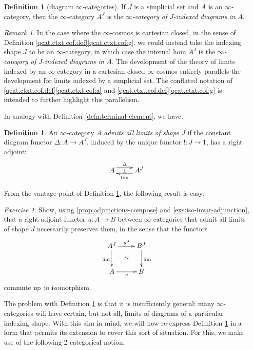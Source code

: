 \documentclass[12pt,reqno]{amsart}
\theoremstyle{plain}
\theoremstyle{definition}
\newtheorem{defn}[thm]{Definition}
\theoremstyle{remark}
\newtheorem{rmk}[thm]{Remark}
\newtheorem{exs}[thm]{Exercise}
\numberwithin{equation}{subsection}
\begin{document}
\begin{defn}[diagram $\infty$-categories]\label{defn:diagram-cats} If $J$ is a simplicial set and $A$ is an $\infty$-category, then the $\infty$-category $A^J$ is the \emph{$\infty$-category of $J$-indexed diagrams in $A$}.
\end{defn}

\begin{rmk}
In the case where the $\infty$-cosmos is cartesian closed, in the sense of Definition \ref{qcat.ctxt.cof.def}\ref{qcat.ctxt.cof:g}, we could instead take the indexing shape $J$ to be an $\infty$-category, in which case the internal hom $A^J$ is the \emph{$\infty$-category of $J$-indexed diagrams in $A$}. The development of the theory of limits indexed by an $\infty$-category in a cartesian closed $\infty$-cosmos entirely parallels the development for limits indexed by a simplicial set. The conflated notation of \ref{qcat.ctxt.cof.def}\ref{qcat.ctxt.cof:a} and \ref{qcat.ctxt.cof.def}\ref{qcat.ctxt.cof:g} is intended to further highlight this parallelism.
\end{rmk}

In analogy with Definition \ref{defn:terminal-element}, we have:

\begin{defn}\label{defn:all-limits} An $\infty$-category $A$ \emph{admits all limits of shape $J$} if the constant diagram functor $\Delta \colon A \to A^J$, induced by the unique functor $!\colon  J \to 1$, has a right adjoint:
\[ \xymatrix{ A \ar@<1ex>[r]^-\Delta \ar@{}[r]|-\perp & A^J \ar@<1ex>[l]^-{\lim}}\] 
\end{defn}

From the vantage point of Definition \ref{defn:all-limits}, the following result is easy:

\begin{exs} Show, using \ref{prop:adjunctions-compose} and \ref{exs:iso-invar-adjunction},  that a right adjoint functor $u \colon A \to B$ between $\infty$-categories that admit all limits of shape $J$  necessarily preserves them, in the sense that the functors
\[ \xymatrix{ A^J \ar[d]_{\lim} \ar[r]^{u^J} & B^J \ar[d]^{\lim} \ar@{}[dl]|\cong \\ A \ar[r]_u & B}\] commute up to isomorphism.
\end{exs}

The problem with Definition \ref{defn:all-limits} is that it is insufficiently general: many $\infty$-categories will have certain, but not all, limits of diagrams of a particular indexing shape. With this aim in mind, we will now re-express Definition \ref{defn:all-limits} in a form that permits its extension to cover this sort of situation. For this, we make use of the following 2-categorical notion.
\end{document}
